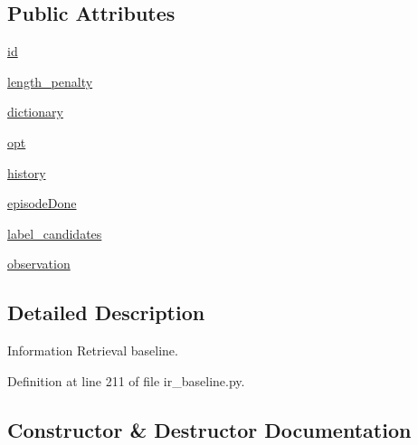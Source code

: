 \subsection*{Public Attributes}
\begin{DoxyCompactItemize}
\item 
\hyperlink{classparlai_1_1agents_1_1ir__baseline_1_1ir__baseline_1_1IrBaselineAgent_afdd605338d0cea9ff8813474b07c21e0}{id}
\item 
\hyperlink{classparlai_1_1agents_1_1ir__baseline_1_1ir__baseline_1_1IrBaselineAgent_a766788ecf47ab2d015b92dc2c9c191e3}{length\+\_\+penalty}
\item 
\hyperlink{classparlai_1_1agents_1_1ir__baseline_1_1ir__baseline_1_1IrBaselineAgent_aedad9637cf632a08f3008765d3debcfa}{dictionary}
\item 
\hyperlink{classparlai_1_1agents_1_1ir__baseline_1_1ir__baseline_1_1IrBaselineAgent_a2c83d3c7e15884871dbfabea9f110933}{opt}
\item 
\hyperlink{classparlai_1_1agents_1_1ir__baseline_1_1ir__baseline_1_1IrBaselineAgent_a8644e518e11536f13338eafcda213d0c}{history}
\item 
\hyperlink{classparlai_1_1agents_1_1ir__baseline_1_1ir__baseline_1_1IrBaselineAgent_ae7e51422143ac04c563c6af1d777a564}{episode\+Done}
\item 
\hyperlink{classparlai_1_1agents_1_1ir__baseline_1_1ir__baseline_1_1IrBaselineAgent_aa7619e8bcb4c75322f0ce7ac9a6cb860}{label\+\_\+candidates}
\item 
\hyperlink{classparlai_1_1agents_1_1ir__baseline_1_1ir__baseline_1_1IrBaselineAgent_a5bc444602ee2228fd3340a5c6a5615d8}{observation}
\end{DoxyCompactItemize}


\subsection{Detailed Description}
\begin{DoxyVerb}Information Retrieval baseline.\end{DoxyVerb}
 

Definition at line 211 of file ir\+\_\+baseline.\+py.



\subsection{Constructor \& Destructor Documentation}
\mbox{\label{classparlai_1_1agents_1_1ir__baseline_1_1ir__baseline_1_1IrBaselineAgent_a7c734ad9e54fd95fc080e9e51f7a7bbc}} 
